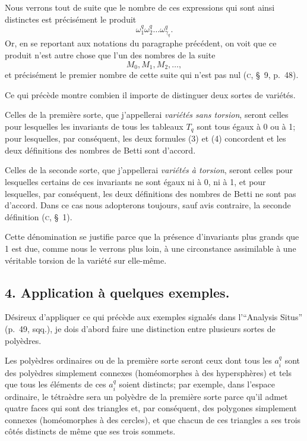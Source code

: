 \documentclass{article}
\begin{document}
Nous verrons tout de suite que le nombre de ces expressions qui sont ainsi distinctes est précisément le produit
\[ \omega^{q}_{1} \omega^{q}_{2} \ldots \omega^{q}_{\gamma_{q}}. \]
Or, en se reportant aux notations du paragraphe précédent, on voit que ce produit n'est autre chose que l'un des nombres de la suite
\[ M_{0}, M_{1}, M_{2}, \ldots, \]
et précisément le premier nombre de cette suite qui n'est pas nul (\textsc{c}, \S~9, p.\ 48).

Ce qui précède montre combien il importe de distinguer deux sortes de variétés.

Celles de la première sorte, que j'appellerai \emph{variétés sans torsion}, seront celles pour lesquelles les invariants de tous les tableaux $T_{q}$ sont tous égaux à 0 ou à 1; pour lesquelles, par conséquent, les deux formules (3) et (4) concordent et les deux définitions des nombres de Betti sont d'accord.

Celles de la seconde sorte, que j'appellerai \emph{variétés à torsion}, seront celles pour lesquelles certains de ces invariants ne sont égaux ni à 0, ni à 1, et pour lesquelles, par conséquent, les deux définitions des nombres de Betti ne sont pas d'accord. Dans ce cas nous adopterons toujours, sauf avis contraire, la seconde définition (\textsc{c}, \S~1).

Cette dénomination se justifie parce que la présence d'invariants plus grands que 1 est due, comme nous le verrons plus loin, à une circonstance assimilable à une véritable torsion de la variété sur elle-même.

\subsection*{4. Application à quelques exemples.}

Désireux d'appliquer ce qui précède aux exemples signalés dans l'“Analysis Situs” (p.\ 49, sqq.), je dois d'abord faire une distinction entre plusieurs sortes de polyèdres.

Les polyèdres ordinaires ou de la première sorte seront ceux dont tous les $a^{q}_{i}$ sont des polyèdres simplement connexes (homéomorphes à des hypersphères) et tels que tous les éléments de ces $a^{q}_{i}$ soient distincts; par exemple, dans l'espace ordinaire, le tétraèdre sera un polyèdre de la première sorte parce qu'il admet quatre faces qui sont des triangles et, par conséquent, des polygones simplement connexes (homéomorphes à des cercles), et que chacun de ces triangles a ses trois côtés distincts de même que ses trois sommets.
\end{document}
